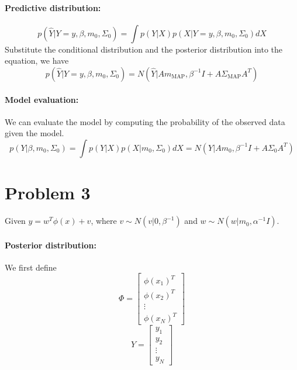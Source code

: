 \documentclass[a4paper,12pt]{article}
\begin{document}
\paragraph{Predictive distribution:}
\begin{equation*}
	p(\hat{Y}|Y = y, \beta, m_0, \Sigma_0) = \int p(Y|X) p(X|Y = y, \beta, m_0, \Sigma_0) dX
\end{equation*}
Substitute the conditional distribution and the posterior distribution into the equation, we have
\begin{equation*}
	p(\hat{Y}|Y = y, \beta, m_0, \Sigma_0) = N(\hat{Y}|Am_\text{MAP}, \beta^{-1} I + A \Sigma_\text{MAP} A^T)
\end{equation*}

\paragraph{Model evaluation:}
We can evaluate the model by computing the probability of the observed data given the model.
\begin{equation*}
	p(Y|\beta, m_0, \Sigma_0) = \int p(Y|X) p(X|m_0, \Sigma_0) dX = N(Y|Am_0, \beta^{-1} I + A \Sigma_0 A^T)
\end{equation*}

\section*{Problem 3}

Given $y = w^T \phi(x) + v$, where $v \sim N(v|0, \beta^{-1})$ and $w \sim N(w|m_0, \alpha^{-1} I)$.

\paragraph{Posterior distribution:}
We first define
\begin{equation*}
	\Phi = \begin{bmatrix}
		\phi(x_1)^T \\
		\phi(x_2)^T \\
		\vdots \\
		\phi(x_N)^T
	\end{bmatrix}
\end{equation*}
\begin{equation*}
	Y = \begin{bmatrix}
		y_1 \\
		y_2 \\
		\vdots \\
		y_N
	\end{bmatrix}
\end{equation*}
\end{document}
